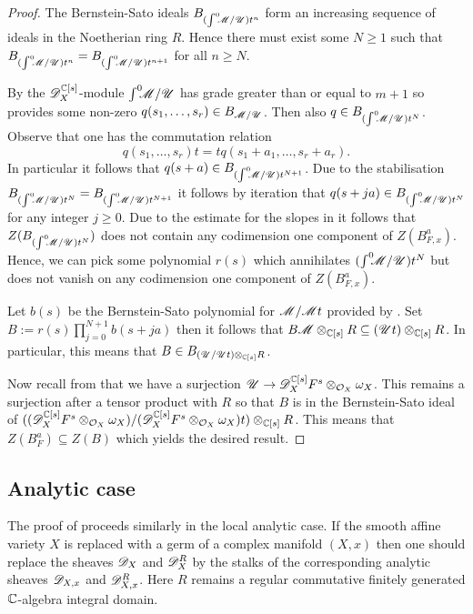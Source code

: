 \begin{proof}
  The Bernstein-Sato ideals $B_{(\int^0 \mkern -8mu\mathscr{M}/\mathscr{U})t^n}$ form an increasing sequence of ideals in the Noetherian ring $R$.
  Hence there must exist some $N\geq 1$ such that $B_{(\int^0 \mkern -8mu\mathscr{M}/\mathscr{U})t^n} = B_{(\int^0 \mkern -8mu\mathscr{M}/\mathscr{U})t^{n+1}}$ for all $n\geq N$.

  By  the $\mathscr{D}_X^{\mathbb{C}[s]}$-module $\int^0 \mkern -8mu\mathscr{M}/\mathscr{U}$ has grade greater than or equal to $m + 1$ so  provides some non-zero $q(s_1,\ldots,s_r) \in B_{\mathscr{M}/\mathscr{U}}$.
	Then also $q\in B_{(\int^0 \mkern -8mu\mathscr{M}/\mathscr{U})t^N}$.
  Observe that one has the commutation relation
  $$q(s_1,\ldots,s_r)t = tq(s_1+a_1,\ldots, s_r + a_r).$$
  In particular it follows that $q(s + a)\in B_{(\int^0 \mkern -8mu\mathscr{M}/\mathscr{U})t^{N+1}}$.
  Due to the stabilisation $B_{(\int^0 \mkern -8mu\mathscr{M}/\mathscr{U})t^N} = B_{(\int^0 \mkern -8mu\mathscr{M}/\mathscr{U})t^{N+1}}$ it follows by iteration that $q(s+ja)\in B_{(\int^0 \mkern -8mu\mathscr{M}/\mathscr{U})t^N}$ for any integer $j\geq 0$.
  Due to the estimate for the slopes in  it follows that $Z(B_{(\int^0 \mkern -8mu\mathscr{M}/\mathscr{U})t^N})$ does not contain any codimension one component of $Z(B_{F,x}^a)$.
  Hence, we can pick some polynomial $r(s)$ which annihilates $(\int^0 \mkern -8mu\mathscr{M}/\mathscr{U})t^N$ but does not vanish on any codimension one component of $Z(B_{F,x}^a)$.

  Let $b(s)$ be the Bernstein-Sato polynomial for $\mathscr{M}/\mathscr{M} t$ provided by .
  Set $B := r(s)\prod_{j=0}^{N+1} b(s+ ja)$ then it follows that
  $B\mathscr{M}\otimes_{\mathbb{C}[s]}R \subseteq (\mathscr{U} t)\otimes_{\mathbb{C}[s]}R$.
  In particular, this means that $B\in B_{(\mathscr{U}/\mathscr{U} t)\otimes_{\mathbb{C}[s]}R}$.

	Now recall from  that we have a surjection $\mathscr{U} \to \mathscr{D}_X^{\mathbb{C}[s]}F^s \otimes_{\mathcal{O}_X}\omega_X$.
	This remains a surjection after a tensor product with $R$ so that $B$ is in the Bernstein-Sato ideal of $((\mathscr{D}_X^{\mathbb{C}[s]}F^s \otimes_{\mathcal{O}_X}\omega_X)/(\mathscr{D}_X^{\mathbb{C}[s]}F^s \otimes_{\mathcal{O}_X}\omega_X)t ) \otimes_{\mathbb{C}[s]}R$.
	This means that $Z(B_F^a)\subseteq Z(B)$ which yields the desired result.
\end{proof}
\subsection{Analytic case}
The proof of  proceeds similarly in the local analytic case.
If the smooth affine variety $X$ is replaced with a germ of a complex manifold $(X,x)$ then one should replace the sheaves $\mathscr{D}_X$ and $\mathscr{D}_X^R$ by the stalks of the corresponding analytic sheaves $\mathscr{D}_{X,x}$ and $\mathscr{D}_{X,x}^R$.
Here $R$ remains a regular commutative finitely generated $\mathbb{C}$-algebra integral domain.

